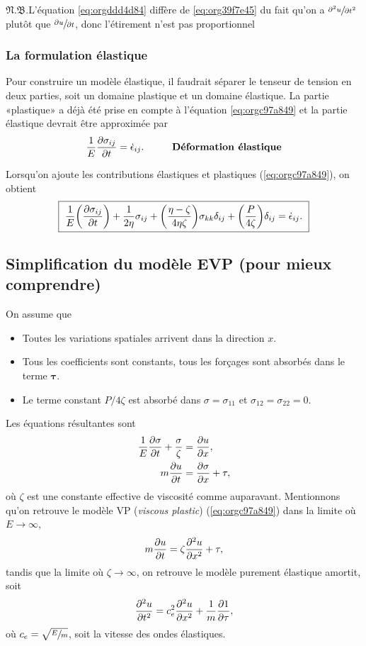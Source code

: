 \documentclass[10pt]{article}
\numberwithin{equation}{section}
\newcommand{\pt}{\hspace{1pt}} %
\newcommand{\nb}{\underline{{\footnotesize\EightStarConvex}\pt $\mathfrak{N.B.}$\vphantom{p}}\hspace{3pt}}
\begin{document}
\nb L'équation \ref{eq:orgddd4d84} diffère de \ref{eq:org39f7e45} du fait qu'on a \(\sfrac{\partial^2 u}{\partial t^2}\) plutôt que \(\sfrac{\partial u}{\partial t}\), donc l'étirement n'est pas proportionnel 

\subsubsection{La formulation élastique}
\label{sec:orgffd4e5a}
Pour construire un modèle élastique, il faudrait séparer le tenseur de tension en deux parties, soit un domaine plastique et un domaine élastique.
La partie «plastique» a déjà été prise en compte à l'équation \ref{eq:orgc97a849} et la partie élastique devrait être approximée par
\begin{equation}
   \frac{1}{E} \pdv{\sigma_{ij}}{t} = \dot{\epsilon}_{ij}. \hspace{1cm} \text{\textbf{Déformation élastique}}
\end{equation}

Lorsqu'on ajoute les contributions élastiques et plastiques (\ref{eq:orgc97a849}), on obtient
\begin{equation}
   \boxed{\ \frac{1}{E} \qty(\pdv{\sigma_{ij}}{t}) + \frac{1}{2\eta}\sigma_{ij} + \qty(\frac{\eta - \zeta}{4\eta\zeta}) \sigma_{kk} \delta_{ij} + \qty(\frac{P}{4\zeta}) \delta_{ij} = \dot{\epsilon}_{ij}.\ }
\end{equation}


\subsection{Simplification du modèle EVP (pour mieux comprendre)}
\label{sec:orgf0f049c}
On assume que
\begin{itemize}
\item Toutes les variations spatiales arrivent dans la direction \(x\).
\item Tous les coefficients sont constants, tous les forçages sont absorbés dans le terme \(\boldsymbol{\tau}\).
\item Le terme constant \(P/4\zeta\) est absorbé dans \(\sigma = \sigma_{11}\) et \(\sigma_{12}=\sigma_{22} = 0\).
\end{itemize}

Les équations résultantes sont
\begin{align}
   \frac{1}{E}\pdv{\sigma}{t} + \frac{\sigma}{\zeta} &= \pdv{u}{x}, \\
   m\pdv{u}{t} &= \pdv{\sigma}{x} + \tau,
\end{align}
où \(\zeta\) est une constante effective de viscosité comme auparavant.
Mentionnons qu'on retrouve le modèle VP (\emph{viscous plastic}) (\ref{eq:orgc97a849}) dans la limite où \(E\rightarrow\infty\),
\begin{equation}
   m\pdv{u}{t} = \zeta\pdv[2]{u}{x} + \tau,
\end{equation}
tandis que la limite où \(\zeta\rightarrow\infty\), on retrouve le modèle purement élastique amortit, soit
\begin{equation}
   \pdv[2]{u}{t} = c_e^2\pdv[2]{u}{x} + \frac{1}{m}\pdv{1}{\tau},
\end{equation}
où \(c_e = \sqrt{\sfrac{E}{m}}\), soit la vitesse des ondes élastiques. 
\end{document}
